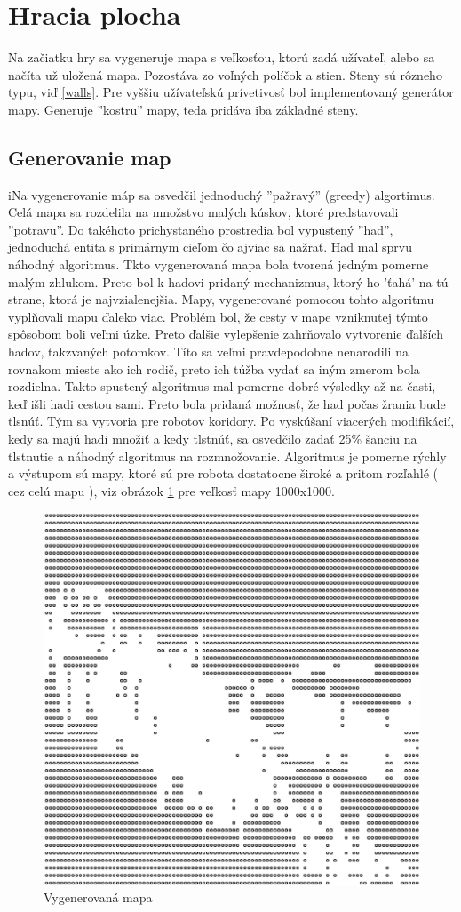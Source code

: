 \section{Hracia plocha} %
Na začiatku hry sa vygeneruje mapa s veľkosťou, ktorú zadá užívateľ, alebo sa načíta už uložená mapa. Pozostáva zo voľných políčok a stien. Steny sú rôzneho typu, viď \ref{walls}. Pre vyššiu užívateľskú prívetivosť bol implementovaný generátor mapy. Generuje ''kostru'' mapy, teda pridáva iba základné steny.
\subsection{Generovanie map}%
iNa vygenerovanie máp sa osvedčil jednoduchý ''pažravý'' (greedy) algortimus. Celá mapa sa rozdelila na množstvo malých kúskov, ktoré predstavovali ''potravu''. Do takéhoto prichystaného prostredia bol vypustený ''had'', jednoduchá entita s primárnym cieľom čo ajviac sa nažrať. Had mal sprvu náhodný algoritmus. Tkto vygenerovaná mapa bola tvorená jedným pomerne malým zhlukom. Preto bol k hadovi pridaný mechanizmus, ktorý ho 'ťahá' na tú strane, ktorá je najvzialenejšia. Mapy, vygenerované pomocou tohto algoritmu vyplňovali mapu ďaleko viac. Problém bol, že cesty v mape vzniknutej týmto spôsobom boli veľmi úzke. Preto ďalšie vylepšenie zahrňovalo vytvorenie ďalších hadov, takzvaných potomkov. Títo sa veľmi pravdepodobne nenarodili na rovnakom mieste ako ich rodič, preto ich túžba vydať sa iným zmerom bola rozdielna. Takto spustený algoritmus mal pomerne dobré výsledky až na časti, keď išli hadi cestou sami. Preto bola pridaná možnosť, že had počas žrania bude tlsnúť. Tým sa vytvoria pre robotov koridory. Po vyskúšaní viacerých modifikácií, kedy sa majú hadi množiť a kedy tlstnúť, sa osvedčilo zadať 25\% šanciu na tlstnutie a náhodný algoritmus na rozmnožovanie. Algoritmus je pomerne rýchly a výstupom sú mapy, ktoré sú pre robota dostatocne široké a pritom rozľahlé ( cez celú mapu ), viz obrázok \ref{fig:mapa} pre veľkosť mapy 1000x1000.
\begin{figure}
\centering
\includegraphics[totalheight=0.2\textheight,width=.6\textwidth]{mapa}
\caption {Vygenerovaná mapa}
\label{fig:mapa}
\end{figure}

